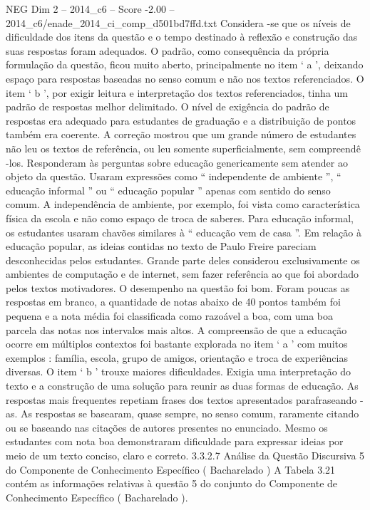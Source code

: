 \begin{textsample}{NEG Dim 2 – 2014\_c6 – Score -2.00 – 2014\_c6/enade\_2014\_ci\_comp\_d501bd7ffd.txt}
Considera -se que os níveis de dificuldade dos itens da questão e o tempo destinado à reflexão e construção das suas respostas foram adequados.
O padrão, como consequência da própria formulação da questão, ficou muito aberto, principalmente no item ‘ a ’, deixando espaço para respostas baseadas no senso comum e não nos textos referenciados.
O item ‘ b ’, por exigir leitura e interpretação dos textos referenciados, tinha um padrão de respostas melhor delimitado.
O nível de exigência do padrão de respostas era adequado para estudantes de graduação e a distribuição de pontos também era coerente.
A correção mostrou que um grande número de estudantes não leu os textos de referência, ou leu somente superficialmente, sem compreendê -los.
Responderam às perguntas sobre educação genericamente sem atender ao objeto da questão.
Usaram expressões como “ independente de ambiente ”, “ educação informal ” ou “ educação popular ” apenas com sentido do senso comum.
A independência de ambiente, por exemplo, foi vista como característica física da escola e não como espaço de troca de saberes.
Para educação informal, os estudantes usaram chavões similares à “ educação vem de casa ”.
Em relação à educação popular, as ideias contidas no texto de Paulo Freire pareciam desconhecidas pelos estudantes.
Grande parte deles considerou exclusivamente os ambientes de computação e de internet, sem fazer referência ao que foi abordado pelos textos motivadores.
O desempenho na questão foi bom.
Foram poucas as respostas em branco, a quantidade de notas abaixo de 40 pontos também foi pequena e a nota média foi classificada como razoável a boa, com uma boa parcela das notas nos intervalos mais altos.
A compreensão de que a educação ocorre em múltiplos contextos foi bastante explorada no item ‘ a ’ com muitos exemplos : família, escola, grupo de amigos, orientação e troca de experiências diversas.
O item ‘ b ’ trouxe maiores dificuldades.
Exigia uma interpretação do texto e a construção de uma solução para reunir as duas formas de educação.
As respostas mais frequentes repetiam frases dos textos apresentados parafraseando -as.
As respostas se basearam, quase sempre, no senso comum, raramente citando ou se baseando nas citações de autores presentes no enunciado.
Mesmo os estudantes com nota boa demonstraram dificuldade para expressar ideias por meio de um texto conciso, claro e correto. 3.3.2.7 Análise da Questão Discursiva 5 do Componente de Conhecimento Específico ( Bacharelado ) A Tabela 3.21 contém as informações relativas à questão 5 do conjunto do Componente de Conhecimento Específico ( Bacharelado ).

\end{textsample}
